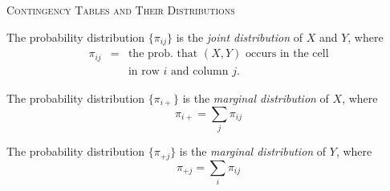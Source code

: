 \documentclass[dvipdfmx, serif,handout]{beamer}
\begin{document}
%
%
\begin{frame}{\textsc{Contingency Tables and Their Distributions}}

	\bi
	\item The probability distribution $\{\pi_{ij}\}$ is the {\it joint distribution} of $X$ and $Y$, where
	\begin{eqnarray*}
		\pi_{ij} &=& \mbox{the prob. that $(X,Y)$ occurs in the cell}\\
		&& \mbox{in row $i$ and column $j$.}
	\end{eqnarray*}
	\item The probability distribution $\{\pi_{i+}\}$ is the {\it marginal distribution} of $X$, where
	$$\pi_{i+} = \sum_j \pi_{ij}$$
	\item The probability distribution $\{\pi_{+j}\}$ is the {\it marginal distribution} of $Y$, where
	$$\pi_{+j} = \sum_i \pi_{ij}$$
	\ei

\end{frame}
\end{document}

